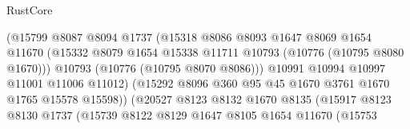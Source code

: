 \begin{lexlean}{RustCore}
\begin{coremodule}
                                      (@15799
                                        @8087
                                        @8094
                                        @1737
                                        (@15318
                                          @8086
                                          @8093
                                          @1647
                                          @8069
                                          @1654
                                          @11670
                                          (@15332
                                            @8079
                                            @1654
                                            @15338
                                            @11711
                                            @10793
                                            (@10776 (@10795 @8080 @1670)))
                                          @10793
                                          (@10776 (@10795 @8070 @8086)))
                                        @10991
                                        @10994
                                        @10997
                                        @11001
                                        @11006
                                        @11012)
                                      (@15292
                                        @8096
                                        @360
                                        @95
                                        @45
                                        @1670
                                        @3761
                                        @1670
                                        @1765
                                        @15578
                                        @15598))
                                    (@20527
                                      @8123
                                      @8132
                                      @1670
                                      @8135
                                      (@15917
                                        @8123
                                        @8130
                                        @1737
                                        (@15739
                                          @8122
                                          @8129
                                          @1647
                                          @8105
                                          @1654
                                          @11670
                                          (@15753

\end{coremodule}
\end{lexlean}
